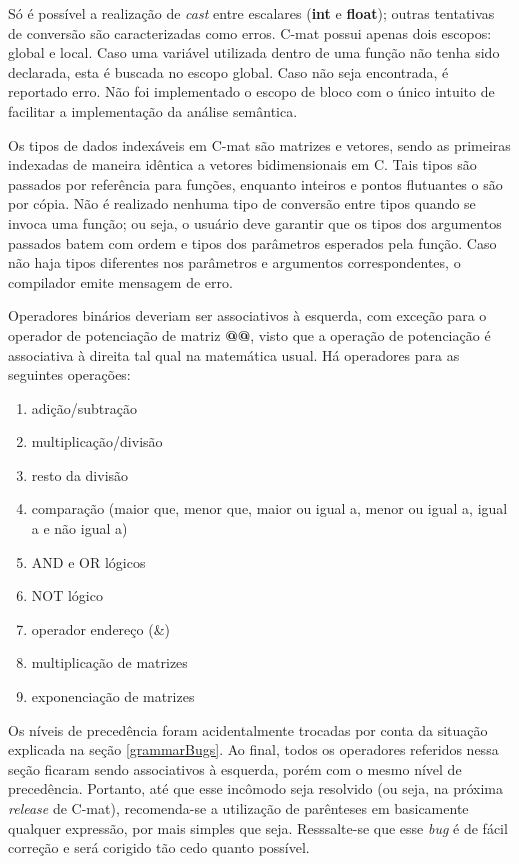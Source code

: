 \documentclass[
	article,			%
	11pt,				%
	oneside,			%
	a4paper,			%
	english,			%
	brazil,				%
	sumario=tradicional
	]{abntex2}
\renewcommand{\it}[1]{\textit{#1}}
\renewcommand{\bf}[1]{\textbf{#1}}
\begin{document}
Só é possível a realização de \it{cast} entre escalares (\bf{int} e \bf{float}); outras tentativas de conversão são caracterizadas como erros. C-mat possui apenas dois escopos: global e local. Caso uma variável utilizada dentro de uma função não tenha sido declarada, esta é buscada no escopo global. Caso não seja encontrada, é reportado erro. Não foi implementado o escopo de bloco com o
único intuito de facilitar a implementação da análise semântica.

Os tipos de dados indexáveis em C-mat são matrizes e vetores, sendo as primeiras indexadas de maneira idêntica a vetores bidimensionais em C. Tais tipos são passados por referência para funções, enquanto inteiros e pontos flutuantes o são por cópia. Não é realizado nenhuma tipo de conversão entre tipos quando se invoca uma função; ou seja, o usuário deve garantir que os tipos dos argumentos passados batem com ordem e tipos dos parâmetros esperados pela função. Caso não haja tipos diferentes nos parâmetros e argumentos correspondentes, o compilador emite mensagem de erro.

Operadores binários deveriam ser associativos à esquerda, com exceção para o operador de potenciação de matriz \bf{@@}, visto que a operação de potenciação é associativa à direita tal qual na matemática usual. Há operadores para as seguintes operações:
\begin{enumerate}
	\item adição/subtração
	\item multiplicação/divisão
	\item resto da divisão
	\item comparação (maior que, menor que, maior ou igual a, menor ou igual a, igual a e não igual a)
	\item AND e OR lógicos
	\item NOT lógico
	\item operador endereço (\&)
	\item multiplicação de matrizes
	\item exponenciação de matrizes
\end{enumerate}

Os níveis de precedência foram acidentalmente trocadas por conta da situação explicada na seção \ref{grammarBugs}. Ao final, todos os operadores referidos nessa seção ficaram sendo associativos à esquerda, porém com o mesmo nível de precedência. Portanto, até que esse incômodo seja resolvido (ou seja, na próxima \it{release} de C-mat), recomenda-se a utilização de parênteses em basicamente qualquer expressão, por mais simples que seja. Resssalte-se que esse \it{bug} é de fácil correção e será corigido tão cedo quanto possível.
\end{document}
